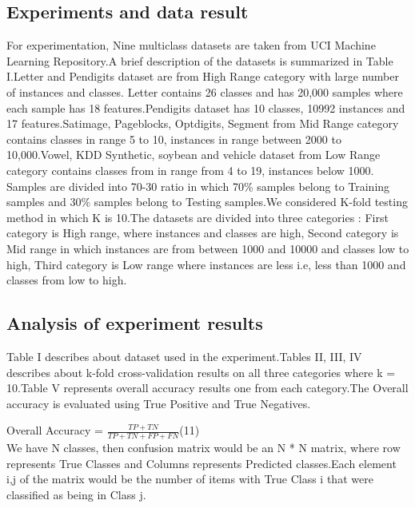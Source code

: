 \documentclass[a4paper, 10pt, conference]{ieeeconf}      %
\begin{document}
\subsection{Experiments and data result}
For experimentation, Nine multiclass datasets are taken from UCI Machine Learning Repository.A brief description of the datasets is summarized in Table I.Letter and Pendigits dataset are from High Range category with large number of instances and classes. Letter contains 26 classes and has 20,000 samples where each sample has 18 features.Pendigits dataset has 10 classes, 10992 instances and 17 features.Satimage, Pageblocks, Optdigits, Segment from Mid Range category contains classes in range 5 to 10, instances in range between 2000 to 10,000.Vowel, KDD Synthetic, soybean and vehicle dataset from Low Range category contains classes from in range from 4 to 19, instances below 1000. 
Samples are divided into 70-30 ratio in which 70\% samples belong to Training samples and 30\% samples belong to Testing samples.We considered K-fold testing method in which K is 10.The datasets are divided into three categories : First category is High range, where instances and classes are high, Second category is Mid range in which instances are from between 1000 and 10000 and classes low to high, Third category is Low range where instances are less i.e, less than 1000 and classes from low to high.

\subsection{Analysis of experiment results}
Table I describes about dataset used in the experiment.Tables II, III, IV describes about k-fold cross-validation results on all three categories where k = 10.Table V represents overall accuracy results one from each category.The Overall accuracy is evaluated using True Positive and True Negatives.\\
\par \hspace{0.5cm}Overall Accuracy = $\frac{TP + TN}{TP + TN +FP + FN}$\hspace{1.5cm}(11) \\
\newline
We have N classes, then confusion matrix would be an N * N matrix, where row represents True Classes and Columns represents Predicted classes.Each element {i,j} of the matrix would be the number of items with True Class i that were classified as being in Class j.
\par
\end{document}
